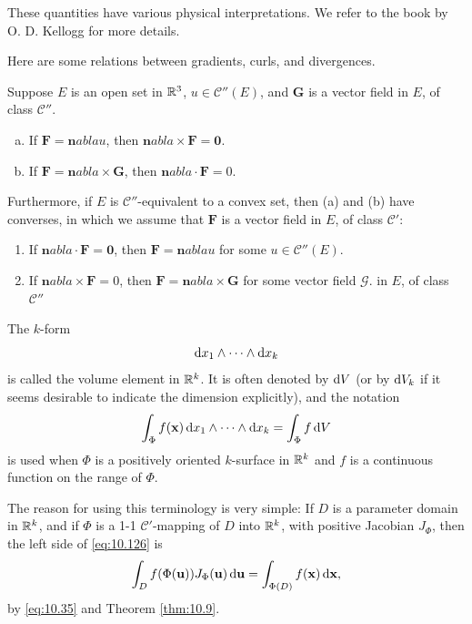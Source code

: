 These quantities have various physical interpretations. 
We refer to the book by O. D. Kellogg\cite{KELLOGG1940} for more details.

Here are some relations between gradients, curls, and divergences.

\begin{thm}
    \label{thm:10.43}
    Suppose $E$ is an open set in ${\protect\mathbb R}^3$, $u \in \mathscr{C}''(E)$, and $\mathbf{G}$ is a vector field in $E$, of class $\mathscr{C}''$.
    \begin{enumerate}[(a)]
        \item If $\mathbf{F} = \mathbf{n}abla u$, then $\mathbf{n}abla \times \mathbf{F} = \mathbf{0}$.
        \item If $\mathbf{F} = \mathbf{n}abla \times \mathbf{G}$, then $\mathbf{n}abla \cdot \mathbf{F} = 0$.
    \end{enumerate}

    Furthermore, if $E$ is $\mathscr{C}''$-equivalent to a convex set, 
    then (a) and (b) have converses, 
    in which we assume that $\mathbf{F}$ is a vector field in $E$, of class $\mathscr{C}'$:
    \begin{enumerate}[(a')]
        \item If $\mathbf{n}abla \cdot \mathbf{F} = \mathbf{0}$, then $\mathbf{F} = \mathbf{n}abla u$ for some $u \in \mathscr{C}''(E)$.
        \item If $\mathbf{n}abla \times \mathbf{F} = 0$, then $\mathbf{F} = \mathbf{n}abla \times \mathbf{G}$ for some vector field $\mathscr{G}$. in $E$, of class $\mathscr{C}''$
    \end{enumerate}
\end{thm}

\begin{mydef}
    \label{mydef:10.44}
    The $k$-form 
    \begin{equation*}
        \d x_1 \wedge \cdots \wedge \d x_k
    \end{equation*}
    is called the volume element in ${\protect\mathbb R}^k$.
    It is often denoted by $\d V$
    (or by $\d V_k$ if it seems desirable to indicate the dimension explicitly),
    and the notation 
    \begin{equation}
        \label{eq:10.126}
        \int_{\Phi} f(\mathbf{x}) 
        \d x_1 \wedge \cdots \wedge \d x_k
        = \int_{\Phi} f \d V
    \end{equation}
    is used when $\Phi$ is a positively oriented $k$-surface in ${\protect\mathbb R}^k$ and $f$ is a continuous function on the range of $\Phi$.

    The reason for using this terminology is very simple: 
    If $D$ is a parameter domain in ${\protect\mathbb R}^k$, 
    and if $\Phi$ is a 1-1 $\mathscr{C}'$-mapping of $D$ into ${\protect\mathbb R}^k$, 
    with positive Jacobian $J_{\Phi}$, then the left side of \eqref{eq:10.126} is
    \begin{equation*}
        \int_D f (\Phi(\mathbf{u})) J_{\Phi}(\mathbf{u}) \d \mathbf{u} =
        \int_{\Phi(D)} f(\mathbf{x}) \d \mathbf{x},
    \end{equation*}
    by \eqref{eq:10.35} and Theorem \ref{thm:10.9}.
\end{mydef}

